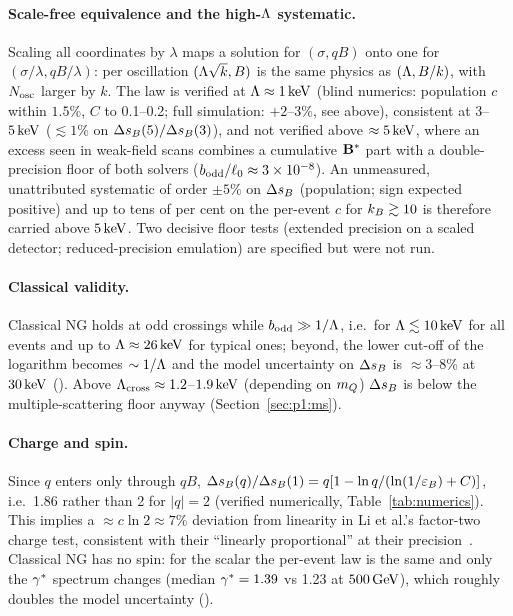 \paragraph{Scale-free equivalence and the high-$\Lambda$ systematic.} Scaling all coordinates by $\lambda$ maps a solution
for $(\sigma,qB)$ onto one for $(\sigma/\lambda,qB/\lambda)$: per oscillation $(\Lambda\sqrt k,B)$ is the same physics as
$(\Lambda,B/k)$, with $N_{\rm osc}$ larger by $k$. The law is verified at $\Lambda\approx1\,\mathrm{keV}$ (blind numerics: population $c$ within
$1.5\%$, $C$ to 0.1--0.2; full simulation: $+2$--$3\%$, see above), consistent at $3$--$5\,\mathrm{keV}$ ($\lesssim1\%$ on $\Delta s_B(5)/\Delta s_B(3)$), and not verified above $\approx5\,\mathrm{keV}$, where
an excess seen in weak-field scans combines a cumulative $\mathbf{B}^*$ part with a double-precision floor of both solvers
($b_{\rm odd}/\ell_0\approx3\times10^{-8}$). An unmeasured, unattributed systematic of order $\pm5\%$ on $\Delta s_B$ (population;
sign expected positive) and up to tens of per cent on the per-event $c$ for $k_B\gtrsim10$ is therefore carried above
$5\,\mathrm{keV}$. Two decisive floor tests (extended precision on a scaled detector; reduced-precision emulation) are specified but
were not run.

\paragraph{Classical validity.} Classical NG holds at odd crossings while $b_{\rm odd}\gg1/\Lambda$, i.e.\ for $\Lambda\lesssim10\,\mathrm{keV}$
for all events and up to $\Lambda\approx26\,\mathrm{keV}$ for typical ones; beyond, the lower cut-off of the logarithm becomes $\sim1/\Lambda$
and the model uncertainty on $\Delta s_B$ is $\approx3$--8\% at $30\,\mathrm{keV}$ (\EST{}). Above $\Lambda_{\rm cross}\approx1.2$--$1.9\,\mathrm{keV}$ (depending on $m_Q$)
$\Delta s_B$ is below the multiple-scattering floor anyway (Section~\ref{sec:p1:ms}).

\paragraph{Charge and spin.} Since $q$ enters only through $qB$, $\Delta s_B(q)/\Delta s_B(1)=q[1-\ln q/(\ln(1/\varepsilon_B)+C)]$, i.e.\
1.86 rather than 2 for $|q|=2$ (verified numerically, Table~\ref{tab:numerics}). This implies a $\approx c\ln2\approx7\%$
deviation from linearity in Li et al.'s factor-two charge test, consistent with their ``linearly proportional'' at their
precision~\cite[Sec.~V.A, Fig.~4]{Li:2020aoq}. Classical NG has no spin: for the scalar the per-event law is the same and
only the $\gamma^*$ spectrum changes (median $\gamma^*=1.39$ vs 1.23 at $500\,\mathrm{GeV}$), which roughly doubles the model uncertainty
(\EST{}).

